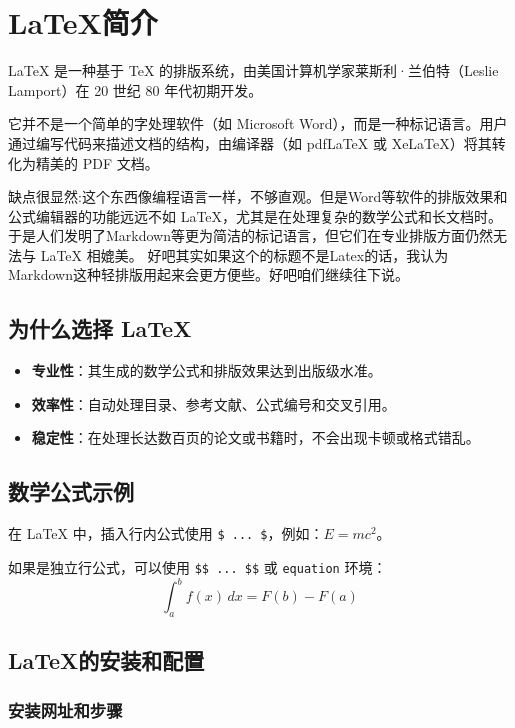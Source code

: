 
\chapter{\LaTeX 简介}

\LaTeX{} 是一种基于 \TeX{} 的排版系统，由美国计算机学家莱斯利·兰伯特（Leslie Lamport）在 20 世纪 80 年代初期开发。

它并不是一个简单的字处理软件（如 Microsoft Word），而是一种标记语言。用户通过编写代码来描述文档的结构，由编译器（如 pdfLaTeX 或 XeLaTeX）将其转化为精美的 PDF 文档。

缺点很显然:这个东西像编程语言一样，不够直观。但是Word等软件的排版效果和公式编辑器的功能远远不如 \LaTeX{}，尤其是在处理复杂的数学公式和长文档时。
于是人们发明了Markdown等更为简洁的标记语言，但它们在专业排版方面仍然无法与 \LaTeX{} 相媲美。
好吧其实如果这个的标题不是Latex的话，我认为Markdown这种轻排版用起来会更方便些。好吧咱们继续往下说。
\section{为什么选择 \LaTeX}
\begin{itemize}
    \item \textbf{专业性}：其生成的数学公式和排版效果达到出版级水准。
    \item \textbf{效率性}：自动处理目录、参考文献、公式编号和交叉引用。
    \item \textbf{稳定性}：在处理长达数百页的论文或书籍时，不会出现卡顿或格式错乱。
\end{itemize}

\section{数学公式示例}
在 \LaTeX{} 中，插入行内公式使用 \texttt{\$ ... \$}，例如：$E=mc^2$。

如果是独立行公式，可以使用 \texttt{\$\$ ... \$\$} 或 \texttt{equation} 环境：
\begin{equation}
    \int_{a}^{b} f(x) \,dx = F(b) - F(a)
\end{equation}
\section{\LaTeX 的安装和配置}
\subsection{安装网址和步骤}
